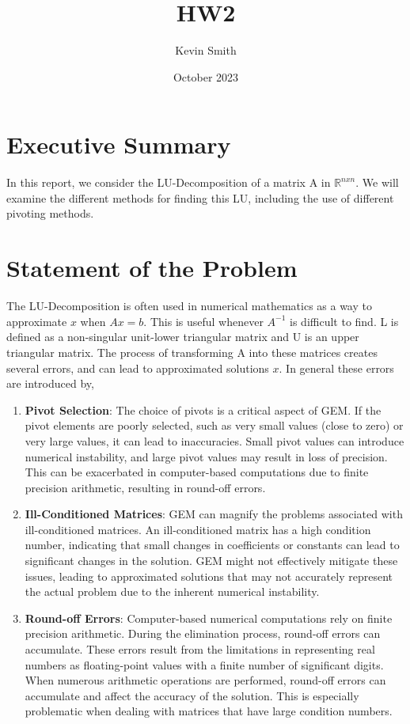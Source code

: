 \documentclass[12pt, letterpaper]{article}
\title{HW2}
\author{Kevin Smith}
\date{October 2023}
\begin{document}
\maketitle
\hspace{-.75cm} 

\section{Executive Summary}

In this report, we consider the LU-Decomposition of a matrix A in $ \mathbb{R}^{nxn}$. We will examine the different methods for finding this LU, including the use of different pivoting methods.

\section{Statement of the Problem}

The LU-Decomposition is often used in numerical mathematics as a way to approximate $x$ when $Ax=b$. This is useful whenever $A^{-1}$ is difficult to find. L is defined as a non-singular unit-lower triangular matrix and U is an upper triangular matrix. The process of transforming A into these matrices creates several errors, and can lead to approximated solutions $x$. In general these errors are introduced by,

\begin{enumerate}
   \item \textbf{Pivot Selection}: The choice of pivots is a critical aspect of GEM. If the pivot elements are poorly selected, such as very small values (close to zero) or very large values, it can lead to inaccuracies. Small pivot values can introduce numerical instability, and large pivot values may result in loss of precision. This can be exacerbated in computer-based computations due to finite precision arithmetic, resulting in round-off errors.

   \item \textbf{Ill-Conditioned Matrices}: GEM can magnify the problems associated with ill-conditioned matrices. An ill-conditioned matrix has a high condition number, indicating that small changes in coefficients or constants can lead to significant changes in the solution. GEM might not effectively mitigate these issues, leading to approximated solutions that may not accurately represent the actual problem due to the inherent numerical instability.

   \item \textbf{Round-off Errors}: Computer-based numerical computations rely on finite precision arithmetic. During the elimination process, round-off errors can accumulate. These errors result from the limitations in representing real numbers as floating-point values with a finite number of significant digits. When numerous arithmetic operations are performed, round-off errors can accumulate and affect the accuracy of the solution. This is especially problematic when dealing with matrices that have large condition numbers.

\end{enumerate}
\end{document}
